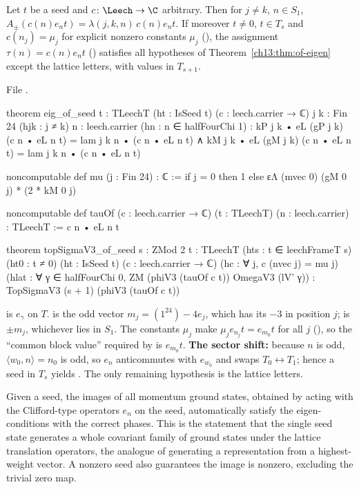 \begin{theorem}\label{ch13:thm:eig-seed}
Let $t$ be a seed and $c\colon\Leech\to\C$ arbitrary. Then for $j\ne k$, $n\in S_1$,
$A_\pm(c(n)e_nt)=\lambda(j,k,n)\,c(n)e_nt$. If moreover $t\ne0$, $t\in T_s$ and $c(n_j)=\mu_j$ for explicit
nonzero constants $\mu_j$ (), the assignment $\tau(n)=c(n)e_nt$ () satisfies all
hypotheses of Theorem~\ref{ch13:thm:of-eigen} except the lattice letters, with values in $T_{s+1}$.
\end{theorem}
\noindent File .
\begin{leancode}
theorem eig_of_seed {t : TLeechT} (ht : IsSeed t) (c : leech.carrier → ℂ) {j k : Fin 24}
    (hjk : j ≠ k) {n : leech.carrier} (hn : n ∈ halfFourChi 1) :
    kP j k • eL (gP j k) (c n • eL n t) = lam j k n • (c n • eL n t) ∧
      kM j k • eL (gM j k) (c n • eL n t) = lam j k n • (c n • eL n t)

noncomputable def mu (j : Fin 24) : ℂ :=
  if j = 0 then 1 else εΛ (mvec 0) (gM 0 j) * (2 * kM 0 j)

noncomputable def tauOf (c : leech.carrier → ℂ) (t : TLeechT) (n : leech.carrier) : TLeechT :=
  c n • eL n t

theorem topSigmaV3_of_seed {s : ZMod 2} {t : TLeechT} (hts : t ∈ leechFrameT s) (ht0 : t ≠ 0)
    (ht : IsSeed t) (c : leech.carrier → ℂ) (hc : ∀ j, c (nvec j) = mu j)
    (hlat : ∀ γ ∈ halfFourChi 0, ZM (phiV3 (tauOf c t)) OmegaV3 (lV' γ)) :
    TopSigmaV3 (s + 1) (phiV3 (tauOf c t))
\end{leancode}
\begin{dictionary}
 is $e_\gamma$ on $T$.  is the odd vector $m_j=(1^{24})-4e_j$, which has its $-3$ in
position $j$;  is $\pm m_j$, whichever lies in $S_1$. The constants $\mu_j$ make
$\mu_je_{n_j}t=e_{m_0}t$ for all $j$ (), so the ``common block value'' required by
 is $e_{m_0}t$. \textbf{The sector shift:} because $n$ is odd, $\langle w_0,n\rangle=n_0$ is
odd, so $e_n$ anticommutes with $e_{w_0}$ and swaps $T_0\leftrightarrow T_1$; hence a seed in $T_s$ yields
. The only remaining hypothesis  is the lattice letters.
\end{dictionary}
\begin{physics}
Given a seed, the images of all momentum ground states, obtained by acting with the Clifford-type operators $e_n$ on the seed, automatically satisfy the eigen-conditions with the correct phases. This is the statement that the single seed state generates a whole covariant family of ground states under the lattice translation operators, the analogue of generating a representation from a highest-weight vector. A nonzero seed also guarantees the image is nonzero, excluding the trivial zero map.
\end{physics}
